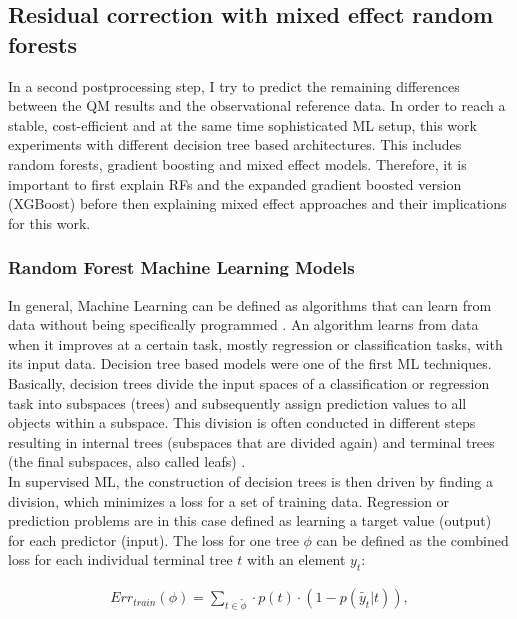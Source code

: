 \documentclass[ba-lentz.tex]{subfile}
\begin{document}
\subsection{Residual correction with mixed effect random forests}

In a second postprocessing step, I try to predict the remaining differences between the QM results and the observational reference data.
In order to reach a stable, cost-efficient and at the same time sophisticated ML setup, this work experiments with different decision tree based architectures.
This includes random forests, gradient boosting and mixed effect models.
Therefore, it is important to first explain RFs and the expanded gradient boosted version (XGBoost) before then explaining mixed effect approaches and their implications for this work.

\subsubsection{Random Forest Machine Learning Models}

In general, Machine Learning can be defined as algorithms that can learn from data without being specifically programmed \parencite{louppe_understanding_2014}.
An algorithm learns from data when it improves at a certain task, mostly regression or classification tasks, with its input data.
Decision tree based models were one of the first ML techniques.
Basically, decision trees divide the input spaces of a classification or regression task into subspaces (trees) and subsequently assign prediction values to all objects within a subspace.
This division is often conducted in different steps resulting in internal trees (subspaces that are divided again) and terminal trees (the final subspaces, also called leafs) \parencite{louppe_understanding_2014}. \\
In supervised ML, the construction of decision trees is then driven by finding a division, which minimizes a loss for a set of training data.
Regression or prediction problems are in this case defined as learning a target value (output) for each predictor (input).
The loss for one tree $\phi$ can be defined as the combined loss for each individual terminal tree $t$ with an element $y_t$:

\begin{align}
    Err_{train} (\phi) = \sum_{t \in \tilde{\phi}} \cdot p(t) \cdot (1 - p(\tilde{y_t} | t)) ,
\end{align}
\end{document}
